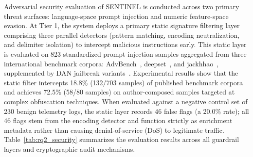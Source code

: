 Adversarial security evaluation of SENTINEL is conducted across two primary threat surfaces: language-space prompt injection and numeric feature-space evasion. At Tier 1, the system deploys a primary static signature filtering layer comprising three parallel detectors (pattern matching, encoding neutralization, and delimiter isolation) to intercept malicious instructions early. This static layer is evaluated on 823 standardized prompt injection samples aggregated from three international benchmark corpora: AdvBench~\cite{advbench2023}, deepset~\cite{deepset2023}, and jackhhao~\cite{jackhhao2023}, supplemented by DAN jailbreak variants~\cite{shen2024dan}. Experimental results show that the static filter intercepts 18.8\% (132/703 samples) of published benchmark corpora and achieves 72.5\% (58/80 samples) on author-composed samples targeted at complex obfuscation techniques. When evaluated against a negative control set of 230 benign telemetry logs, the static layer records 46 false flags (a 20.0\% rate); all 46 flags stem from the encoding detector and function strictly as enrichment metadata rather than causing denial-of-service (DoS) to legitimate traffic. Table~\ref{tab:rq2_security} summarizes the evaluation results across all guardrail layers and cryptographic audit mechanisms.


